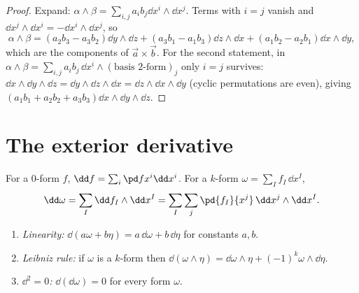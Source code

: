 \begin{proof}
Expand: $\alpha\wedge\beta=\sum_{i,j}a_ib_j\dd x^i\wedge\dd x^j$. Terms with $i=j$ vanish and $\dd x^j\wedge\dd x^i=-\dd x^i\wedge\dd x^j$, so
\[
\alpha\wedge\beta=(a_2b_3-a_3b_2)\dd y\wedge\dd z+(a_3b_1-a_1b_3)\dd z\wedge\dd x+(a_1b_2-a_2b_1)\dd x\wedge\dd y,
\]
which are the components of $\vec a\times\vec b$. For the second statement, in $\alpha\wedge\beta=\sum_{i,j}a_ib_j\,\dd x^i\wedge(\text{basis 2-form})_j$ only $i=j$ survives: $\dd x\wedge\dd y\wedge\dd z=\dd y\wedge\dd z\wedge\dd x=\dd z\wedge\dd x\wedge\dd y$ (cyclic permutations are even), giving $(a_1b_1+a_2b_2+a_3b_3)\dd x\wedge\dd y\wedge\dd z$.
\end{proof}

\section{The exterior derivative}

\begin{definition}
For a $0$-form $f$, $\dd f=\sum_i\pd f{x^i}\dd x^i$. For a $k$-form $\omega=\sum_If_I\,\dd x^I$,
\[
\dd\omega=\sum_I\dd f_I\wedge\dd x^I=\sum_I\sum_j\pd{f_I}{x^j}\,\dd x^j\wedge\dd x^I .
\]
\end{definition}

\begin{theorem}[Properties of $\dd$]\label{thm:dprops}
\begin{enumerate}[label=(\alph*)]
  \item \emph{Linearity:} $\dd(a\omega+b\eta)=a\,\dd\omega+b\,\dd\eta$ for constants $a,b$.
  \item \emph{Leibniz rule:} if $\omega$ is a $k$-form then $\dd(\omega\wedge\eta)=\dd\omega\wedge\eta+(-1)^k\omega\wedge\dd\eta$.
  \item \emph{$\dd^2=0$:} $\dd(\dd\omega)=0$ for every form $\omega$.
\end{enumerate}
\end{theorem}

